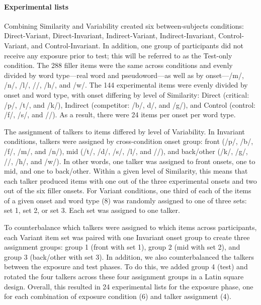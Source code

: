 \documentclass[
  12pt,
  twoside]{article}
\begin{document}
\hypertarget{methods-lists-1a}{%
\paragraph{Experimental lists}\label{methods-lists-1a}}

Combining Similarity and Variability created six between-subjects conditions: Direct-Variant, Direct-Invariant, Indirect-Variant, Indirect-Invariant, Control-Variant, and Control-Invariant.
In addition, one group of participants did not receive any exposure prior to test; this will be referred to as the Test-only condition.
The 288 filler items were the same across conditions and evenly divided by word type---real word and pseudoword---as well as by onset---/m/, /n/, /l/, //, /h/, and /w/.
The 144 experimental items were evenly divided by onset and word type, with onset differing by level of Similarity: Direct (critical: /p/, /t/, and /k/), Indirect (competitor: /b/, d/, and /g/), and Control (control: /f/, /s/, and //).
As a result, there were 24 items per onset per word type.

The assignment of talkers to items differed by level of Variability.
In Invariant conditions, talkers were assigned by cross-condition onset group: front (/p/, /b/, /f/, /m/, and /n/), mid (/t/, /d/, /s/, /l/, and //), and back/other (/k/, /g/, //, /h/, and /w/).
In other words, one talker was assigned to front onsets, one to mid, and one to back/other.
Within a given level of Similarity, this means that each talker produced items with one out of the three experimental onsets and two out of the six filler onsets.
For Variant conditions, one third of each of the items of a given onset and word type (8) was randomly assigned to one of three sets: set 1, set 2, or set 3.
Each set was assigned to one talker.

To counterbalance which talkers were assigned to which items across participants, each Variant item set was paired with one Invariant onset group to create three assignment groups: group 1 (front with set 1), group 2 (mid with set 2), and group 3 (back/other with set 3).
In addition, we also counterbalanced the talkers between the exposure and test phases.
To do this, we added group 4 (test) and rotated the four talkers across these four assignment groups in a Latin square design.
Overall, this resulted in 24 experimental lists for the exposure phase, one for each combination of exposure condition (6) and talker assignment (4).
\end{document}
